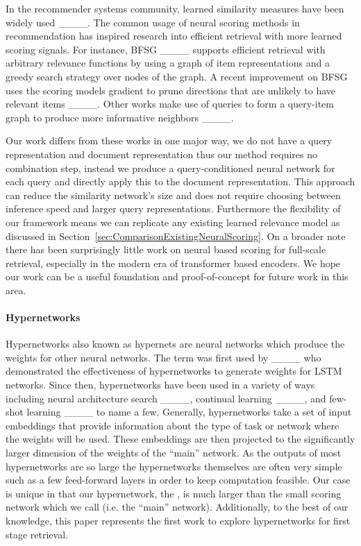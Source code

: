In the recommender systems community, learned similarity measures have been widely used ____. The common usage of neural scoring methods in recommendation has inspired research into efficient retrieval with more learned scoring signals. For instance, BFSG ____ supports efficient retrieval with arbitrary relevance functions by using a graph of item representations and a greedy search strategy over nodes of the graph. A recent improvement on BFSG uses the scoring models gradient to prune directions that are unlikely to have relevant items ____. Other works make use of queries to form a query-item graph to produce more informative neighbors ____.

Our work differs from these works in one major way, we do not have a query representation and document representation thus our method requires no combination step, instead we produce a query-conditioned neural network for each query and directly apply this to the document representation. This approach can reduce the similarity network's size and does not require choosing between inference speed and larger query representations. Furthermore the flexibility of our framework means we can replicate any existing learned relevance model as discussed in Section~\ref{sec:ComparisonExistingNeuralScoring}. On a broader note there has been surprisingly little work on neural based scoring for full-scale retrieval, especially in the modern era of transformer based encoders. We hope our work can be a useful foundation and proof-of-concept for future work in this area.

\paragraph{\textbf{Hypernetworks}}
Hypernetworks also known as hypernets are neural networks which produce the weights for other neural networks. The term was first used by ____ who demonstrated the effectiveness of hypernetworks to generate weights for LSTM networks. Since then, hypernetworks have been used in a variety of ways including neural architecture search ____, continual learning ____, and few-shot learning ____ to name a few. Generally, hypernetworks take a set of input embeddings that provide information about the type of task or network where the weights will be used. These embeddings are then projected to the significantly larger dimension of the weights of the ``main'' network. As the outputs of most hypernetworks are so large the hypernetworks themselves are often very simple such as a few feed-forward layers in order to keep computation feasible. Our case is unique in that our hypernetwork, the \name{}, is much larger than the small scoring network which we call \mininame{} (i.e. the ``main'' network). Additionally, to the best of our knowledge, this paper represents the first work to explore hypernetworks for first stage retrieval.